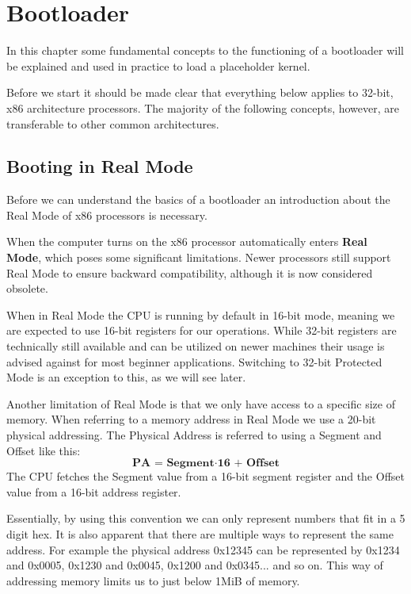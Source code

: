 \chapter{Bootloader}

In this chapter some fundamental concepts to the functioning of a bootloader will be explained and used in practice to load a
placeholder kernel.

Before we start it should be made clear that everything below applies to 32-bit, x86 architecture processors.
The majority of the following concepts, however, are transferable to other common architectures.

\section{Booting in Real Mode}

Before we can understand the basics of a bootloader an introduction about the Real Mode of x86 processors is necessary.

When the computer turns on the x86 processor automatically enters \textbf{Real Mode}, which poses some significant limitations.
Newer processors still support Real Mode to ensure backward compatibility, although it is now considered obsolete.

When in Real Mode the CPU is running by default in 16-bit mode, meaning we are expected to use 16-bit registers for our operations.
While 32-bit registers are technically still available and can be utilized on newer machines their usage is advised against 
for most beginner applications. Switching to 32-bit Protected Mode is an exception to this, as we will see later.

Another limitation of Real Mode is that we only have access to a specific size of memory. When referring to a memory 
address in Real Mode we use a 20-bit physical addressing. The Physical Address is referred to using a Segment and Offset like this: 
\[
\textbf{PA = Segment} \cdot \textbf{16 + Offset}
\]
The CPU fetches the Segment value from a 16-bit segment register and the Offset value from a 16-bit address register.

Essentially, by using this convention we can only represent numbers that fit in a 5 digit hex. It is also apparent that
there are multiple ways to represent the same address. For example the physical address 0x12345 can be represented 
by 0x1234 and 0x0005, 0x1230 and 0x0045, 0x1200 and 0x0345... and so on. This way of addressing memory limits us to just 
below 1MiB of memory.

